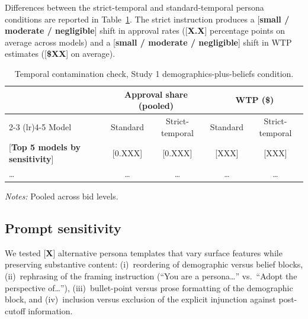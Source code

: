 \documentclass[12pt]{article}
\begin{document}
Differences between the strict-temporal and standard-temporal persona conditions are reported in Table~\ref{tab:temporal}. The strict instruction produces a [\textbf{small / moderate / negligible}] shift in approval rates ([\textbf{X.X}] percentage points on average across models) and a [\textbf{small / moderate / negligible}] shift in WTP estimates ([\textbf{\$XX}] on average).

\begin{table}[h]
    \centering
    \caption{Temporal contamination check, Study 1 demographics-plus-beliefs condition.}
    \label{tab:temporal}
    \begin{threeparttable}
    \begin{tabular}{lcccc}
        \toprule
         & \multicolumn{2}{c}{Approval share (pooled)} & \multicolumn{2}{c}{WTP (\$)} \\
        \cmidrule(lr){2-3} \cmidrule(lr){4-5}
        Model & Standard & Strict-temporal & Standard & Strict-temporal \\
        \midrule
        {[}\textbf{Top 5 models by sensitivity}{]} & [0.XXX] & [0.XXX] & [XXX] & [XXX] \\
        \dots & \dots & \dots & \dots & \dots \\
        \bottomrule
    \end{tabular}
    \begin{tablenotes}\footnotesize
        \item \textit{Notes:} Pooled across bid levels.
    \end{tablenotes}
    \end{threeparttable}
\end{table}

\subsection{Prompt sensitivity}

We tested [\textbf{X}] alternative persona templates that vary surface features while preserving substantive content: (i)~reordering of demographic versus belief blocks, (ii)~rephrasing of the framing instruction (``You are a persona\dots'' vs.\ ``Adopt the perspective of\dots''), (iii)~bullet-point versus prose formatting of the demographic block, and (iv)~inclusion versus exclusion of the explicit injunction against post-cutoff information.
\end{document}
